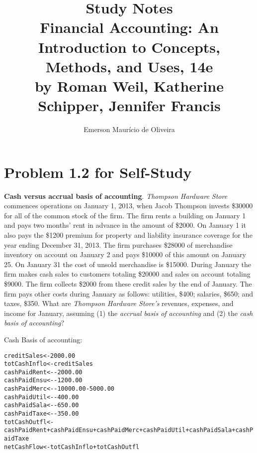 \documentclass{article}\usepackage[]{graphicx}\usepackage[]{xcolor}
\title{Study Notes\\Financial Accounting: An Introduction to Concepts, Methods, and Uses, 14e\\
by Roman Weil, Katherine Schipper, Jennifer Francis}%
\author{Emerson Maurício de Oliveira}%
\makeatletter
\newcommand{\hlnum}[1]{\textcolor[rgb]{0.686,0.059,0.569}{#1}}%
\newcommand{\hlopt}[1]{\textcolor[rgb]{0,0,0}{#1}}%
\newcommand{\hlstd}[1]{\textcolor[rgb]{0.345,0.345,0.345}{#1}}%
\newcommand{\hlkwb}[1]{\textcolor[rgb]{0.69,0.353,0.396}{#1}}%
\newenvironment{kframe}{%
 \def\at@end@of@kframe{}%
 \ifinner\ifhmode%
  \def\at@end@of@kframe{\end{minipage}}%
  \begin{minipage}{\columnwidth}%
 \fi\fi%
 \def\FrameCommand##1{\hskip\@totalleftmargin \hskip-\fboxsep
 \colorbox{shadecolor}{##1}\hskip-\fboxsep
     \hskip-\linewidth \hskip-\@totalleftmargin \hskip\columnwidth}%
 \MakeFramed {\advance\hsize-\width
   \@totalleftmargin\z@ \linewidth\hsize
   \@setminipage}}%
 {\par\unskip\endMakeFramed%
 \at@end@of@kframe}
\newenvironment{knitrout}{}{} %
\newcommand\?{\hphantom{0}}
\makeatother
\begin{document}
\maketitle

\section{Problem 1.2 for Self-Study}

\textbf{Cash versus accrual basis of accounting}. \textit{Thompson Hardware Store} commences 
operations on January 1, 2013, when Jacob Thompson invests \$\num{30000} for all of the common 
stock of the firm. The firm rents a building on January 1 and pays two months' rent in advance 
in the amount of \$\num{2000}. On January 1 it also pays the \$\num{1200} premium for property 
and liability insurance coverage for the year ending December 31, 2013. The firm purchases 
\$\num{28000} of merchandise inventory on account on January 2 and pays \$\num{10000} of this 
amount on January 25. On January 31 the cost of unsold merchandise is \$\num{15000}. During 
January the firm makes cash sales to customers totaling \$\num{20000} and sales on account 
totaling \$\num{9000}. The firm collects \$\num{2000} from these credit sales by the end of 
January. The firm pays other costs during January as follows: utilities, \$\num{400}; salaries, 
\$\num{650}; and taxes, \$\num{350}. What are \textit{Thompson Hardware Store's} revenues, 
expenses, and income for January, assuming (1) the \textit{accrual basis of accounting} and 
(2) the \textit{cash basis of accounting}?

\newpage

Cash Basis of accounting:\par

\begin{knitrout}\scriptsize
{}\color{fgcolor}\begin{kframe}
\begin{alltt}
\hlstd{creditSales} \hlkwb{<-} \hlnum{2000.00}
\hlstd{totCashInflo} \hlkwb{<-} \hlstd{creditSales}
\hlstd{cashPaidRent} \hlkwb{<-} \hlopt{-}\hlnum{2000.00}
\hlstd{cashPaidEnsu} \hlkwb{<-} \hlopt{-}\hlnum{1200.00}
\hlstd{cashPaidMerc} \hlkwb{<-} \hlopt{-}\hlnum{10000.00} \hlopt{-} \hlnum{5000.00}
\hlstd{cashPaidUtil} \hlkwb{<-} \hlopt{-}\hlnum{400.00}
\hlstd{cashPaidSala} \hlkwb{<-} \hlopt{-}\hlnum{650.00}
\hlstd{cashPaidTaxe} \hlkwb{<-} \hlopt{-}\hlnum{350.00}
\hlstd{totCashOutfl} \hlkwb{<-} \hlstd{cashPaidRent} \hlopt{+} \hlstd{cashPaidEnsu} \hlopt{+} \hlstd{cashPaidMerc} \hlopt{+} \hlstd{cashPaidUtil} \hlopt{+} \hlstd{cashPaidSala} \hlopt{+} \hlstd{cashPaidTaxe}
\hlstd{netCashFlow}  \hlkwb{<-} \hlstd{totCashInflo} \hlopt{+} \hlstd{totCashOutfl}
\end{alltt}
\end{kframe}
\end{knitrout}
\end{document}
